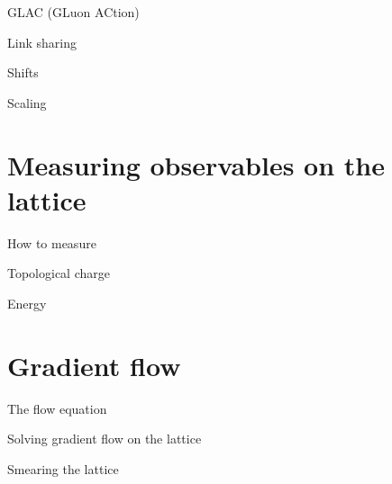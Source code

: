 \documentclass[10pt,show notes on second screen]{beamer}
\begin{document}
\begin{frame}{GLAC (GLuon ACtion)}
\end{frame}

\begin{frame}{Link sharing}
\end{frame}

\begin{frame}{Shifts}
\end{frame}

\begin{frame}{Scaling}
\end{frame}

\section{Measuring observables on the lattice}
\begin{frame}{How to measure}
\end{frame}

\begin{frame}{Topological charge}
\end{frame}

\begin{frame}{Energy}
\end{frame}

\section{Gradient flow}

\begin{frame}{The flow equation}
\end{frame}

\begin{frame}{Solving gradient flow on the lattice}
\end{frame}

\begin{frame}{Smearing the lattice}
\end{frame}
\end{document}
